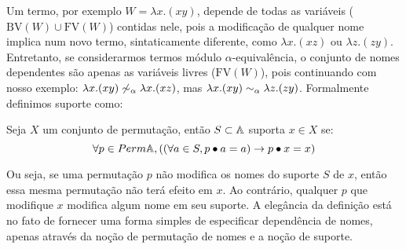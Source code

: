 Um termo, por exemplo $W = \lambda x. (xy)$, depende de todas as variáveis ($\text{BV}(W) \cup \text{FV}(W)$) contidas nele, pois a modificação de qualquer nome implica num novo termo, sintaticamente diferente, como $\lambda x. (xz)$ ou $\lambda z. (zy)$. Entretanto, se considerarmos termos módulo $\alpha$-equivalência, o conjunto de nomes dependentes são apenas as variáveis livres ($\text{FV}(W)$), pois continuando com nosso exemplo: $\lambda x. (xy) \not\sim_{\alpha} \lambda x. (xz)$, mas $\lambda x. (xy) \sim_{\alpha} \lambda z. (zy)$. Formalmente definimos suporte como:
\begin{definicao}[Suporte]
	Seja $X$ um conjunto de permutação, então $S \subset \mathbb{A}$ suporta $x \in X$ se:
	\begin{equation}\label{eq:suporte}
		\forall p \in Perm \mathbb{A}, ((\forall a \in S, p \bullet a = a) \rightarrow p \bullet x = x)
	\end{equation}
\end{definicao}\noindent
Ou seja, se uma permutação $p$ não modifica os nomes do suporte $S$ de $x$, então essa mesma permutação não terá efeito em $x$. Ao contrário, qualquer $p$ que modifique $x$ modifica algum nome em seu suporte. A elegância da definição está no fato de fornecer uma forma simples de especificar dependência de nomes, apenas através da noção de permutação de nomes e a noção de suporte.

